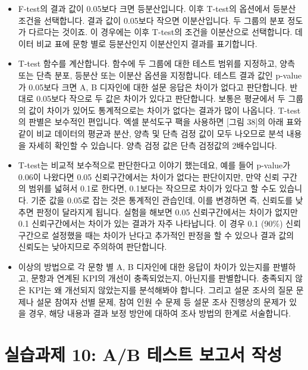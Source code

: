 \documentclass[
  letterpaper,
]{book}
\providecommand{\tightlist}{%
  \setlength{\itemsep}{0pt}\setlength{\parskip}{0pt}}\usepackage{longtable,booktabs,array}
\begin{document}
\begin{itemize}
\tightlist
\item
  F-test의 결과 값이 0.05보다 크면 등분산입니다. 이후 T-test의 옵션에서
  등분산 조건을 선택합니다. 결과 값이 0.05보다 작으면 이분산입니다. 두
  그룹의 분포 정도가 다르다는 것이죠. 이 경우에는 이후 T-test의 조건을
  이분산으로 선택합니다. 데이터 비교 표에 문항 별로 등분산인지
  이분산인지 결과를 표기합니다.
\item
  T-test 함수를 계산합니다. 함수에 두 그룹에 대한 테스트 범위를
  지정하고, 양측 또는 단측 분포, 등분산 또는 이분산 옵션을 지정합니다.
  테스트 결과 값인 p-value가 0.05보다 크면 A, B 디자인에 대한 설문
  응답은 차이가 없다고 판단합니다. 반대로 0.05보다 작으로 두 값은 차이가
  있다고 판단합니다. 보통은 평균에서 두 그룹의 값이 차이가 있어도
  통계적으로는 차이가 없다는 결과가 많이 나옵니다. T-test의 판별은
  보수적인 편입니다. 엑셀 분석도구 팩을 사용하면 {[}그림 38{]}의 아래
  표와 같이 비교 데이터의 평균과 분산, 양측 및 단측 검정 값이 모두
  나오므로 분석 내용을 자세히 확인할 수 있습니다. 양측 검정 값은 단측
  검정값의 2배수입니다.
\item
  T-test는 비교적 보수적으로 판단한다고 이야기 했는데요, 예를 들어
  p-value가 0.06이 나왔다면 0.05 신뢰구간에서는 차이가 없다는
  판단이지만, 만약 신뢰 구간의 범위를 넓혀서 0.1로 한다면, 0.1보다는
  작으므로 차이가 있다고 할 수도 있습니다. 기준 값을 0.05로 잡는 것은
  통계적인 관습인데, 이를 변경하면 즉, 신뢰도를 낮추면 판정이 달라지게
  됩니다. 실험을 해보면 0.05 신뢰구간에서는 차이가 없지만 0.1
  신뢰구간에서는 차이가 있는 결과가 자주 나타납니다. 이 경우 0.1 (90\%)
  신뢰구간으로 설정했을 때는 차이가 난다고 추가적인 판정을 할 수 있으나
  결과 값의 신뢰도는 낮아지므로 주의하여 판단합니다.
\item
  이상의 방법으로 각 문항 별 A, B 디자인에 대한 응답이 차이가 있는지를
  판별하고, 문항과 연계된 KPI의 개선이 충족되었는지, 아닌지를
  판별합니다. 충족되지 않은 KPI는 왜 개선되지 않았는지를 분석해봐야
  합니다. 그리고 설문 조사의 질문 문제나 설문 참여자 선별 문제, 참여
  인원 수 문제 등 설문 조사 진행상의 문제가 있을 경우, 해당 내용과 결과
  보정 방안에 대하여 조사 방법의 한계로 서술합니다.
\end{itemize}

\section{실습과제 10: A/B 테스트 보고서
작성}\label{uxc2e4uxc2b5uxacfcuxc81c-10-ab-uxd14cuxc2a4uxd2b8-uxbcf4uxace0uxc11c-uxc791uxc131}
\end{document}
